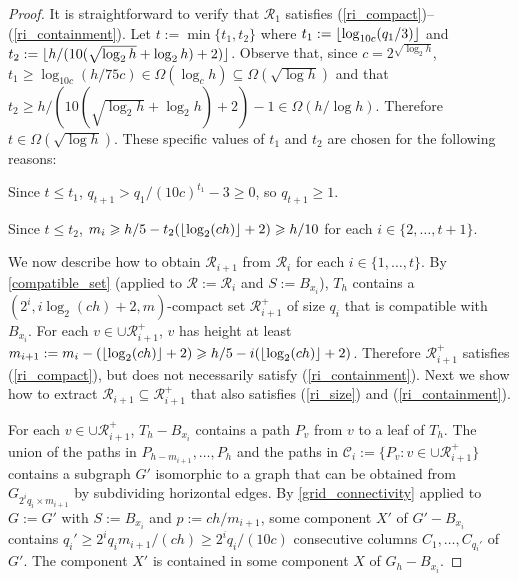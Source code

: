\documentclass{patmorin}
\renewcommand{\le}{\leqslant}
\renewcommand{\ge}{\geqslant}
\begin{document}
\begin{proof}
  It is straightforward to verify that $\mathcal{R}_1$ satisfies (\ref{ri_compact})--(\ref{ri_containment}).
  Let $t:= \min\{t_1,t_2\}$ where $t_1:={\lfloor \log_{10c}(q_1/3) \rfloor}$ and $t_2:={\lfloor h/(10(\sqrt{\log_2 h} + \log_2 h) + 2) \rfloor}$. Observe that, since $c=2^{\sqrt{\log_2 h}}$,  $t_1\ge \log_{10c}(h/75c)\in\Omega(\log_c h)\subseteq \Omega(\sqrt{\log h})$ and that $t_2\ge h/(10(\sqrt{\log_2 h} + \log_2 h) + 2)-1\in\Omega(h/\log h)$.  Therefore $t\in\Omega(\sqrt{\log h})$. These specific values of $t_1$ and $t_2$ are chosen for the following reasons:
  \begin{compactenum}[(i)]
    \item Since $t\le t_1$, $q_{t+1} > q_1/(10c)^{t_1} - 3  \ge 0$, so $q_{t+1}\ge 1$.
    \item Since $t\le t_2$, $m_i \ge h/5-t_2(\floor{\log_2(ch)}+2) \ge h/10$ for each $i\in\{2,\ldots,t+1\}$.
  \end{compactenum}
  We now describe how to obtain $\mathcal{R}_{i+1}$ from $\mathcal{R}_i$ for each $i\in\{1,\ldots,t\}$.  By \cref{compatible_set} (applied to $\mathcal{R}:=\mathcal{R}_i$ and $S:=B_{x_i}$), $T_h$ contains a $(2^i,i\log_2(ch)+2,m)$-compact set $\mathcal{R}_{i+1}^+$ of size $q_i$ that is compatible with $B_{x_i}$. For each $v\in\cup\mathcal{R}_{i+1}^+$, $v$ has height at least $m_{i+1}:=m_i-(\floor{\log_2(ch)}+2)\ge h/5-i(\floor{\log_2(ch)}+2)$.  Therefore $\mathcal{R}_{i+1}^+$ satisfies (\ref{ri_compact}),%
  but does not necessarily satisfy (\ref{ri_containment}).  Next we show how to extract $\mathcal{R}_{i+1}\subseteq\mathcal{R}_{i+1}^+$ that also satisfies (\ref{ri_size}) and (\ref{ri_containment}).

  For each $v\in \cup\mathcal{R}_{i+1}^+$, $T_h-B_{x_i}$ contains a path $P_v$ from $v$ to a leaf of $T_h$.  The union of the paths in $P_{h-m_{i+1}},\ldots,P_{h}$ and the paths in $\mathcal{C}_i:=\{P_v:v\in\cup\mathcal{R}_{i+1}^+\}$ contains a subgraph $G'$ isomorphic to a graph that can be obtained from $G_{2^{i}q_i\times m_{i+1}}$ by subdividing horizontal edges.  By \cref{grid_connectivity} applied to $G:=G'$ with $S:=B_{x_i}$ and $p:=ch/m_{i+1}$, some component $X'$ of $G'-B_{x_i}$ contains  $q_i'\ge 2^{i}q_im_{i+1}/(ch)\ge 2^iq_i/(10c)$ consecutive columns $C_1,\ldots,C_{q_i'}$ of $G'$.  The component $X'$ is contained in some component $X$ of $G_h-B_{x_i}$.


\end{proof}
\end{document}
